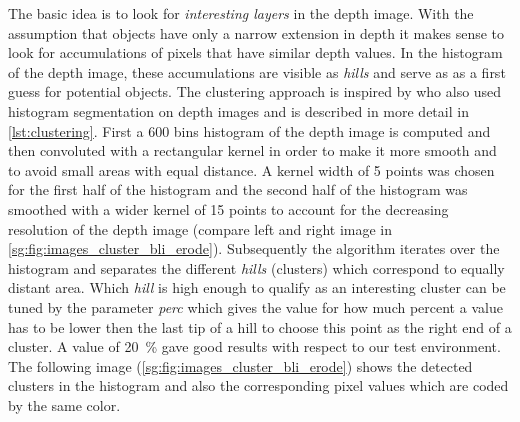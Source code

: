 The basic idea is to look for \emph{interesting layers} in the depth image. With the assumption that objects have only a narrow extension in depth it makes sense to look for accumulations of pixels that have similar depth values. In the histogram of the depth image, these accumulations are visible as \emph{hills} and serve as as a first guess for potential objects. The clustering approach is inspired by \cite{Jivet:tx} who also used histogram segmentation on depth images and is described in more detail in \ref{lst:clustering}. First a 600 bins histogram of the depth image is computed and then convoluted with a rectangular kernel in order to make it more smooth and to avoid small areas with equal distance. A kernel width of 5 points was chosen for the first half of the histogram and the second half of the histogram was smoothed with a wider kernel of 15 points to account for the decreasing resolution of the depth image (compare left and right image in \ref{sg:fig:images_cluster_bli_erode}). Subsequently the algorithm iterates over the histogram and separates the different \emph{hills} (clusters) which correspond to equally distant area. Which \emph{hill} is high enough to qualify as an interesting cluster can be tuned by the parameter \emph{perc} which gives the value for how much percent a value has to be lower then the last tip of a hill to choose this point as the right end of a cluster. A value of 20~\% gave good results with respect to our test environment. The following image (\ref{sg:fig:images_cluster_bli_erode}) shows the detected clusters in the histogram and also the corresponding pixel values which are coded by the same color.

